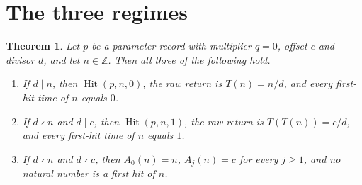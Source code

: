 \documentclass[11pt,letterpaper]{article}
\newcommand{\Z}{\mathbb{Z}}
\newtheorem{theorem}{Theorem}
\begin{document}
\section{The three regimes}

\begin{theorem}
\label{thm:zero-hit-cases}
Let \(p\) be a parameter record with multiplier \(q=0\), offset \(c\) and divisor \(d\), and let \(n\in\Z\). Then all three of the following hold.
\begin{enumerate}[label=\textup{(\roman*)}]
\item If \(d\mid n\), then \(\operatorname{Hit}(p,n,0)\), the raw return is \(T(n)=n/d\), and every first-hit time of \(n\) equals \(0\).
\item If \(d\nmid n\) and \(d\mid c\), then \(\operatorname{Hit}(p,n,1)\), the raw return is \(T(T(n))=c/d\), and every first-hit time of \(n\) equals \(1\).
\item If \(d\nmid n\) and \(d\nmid c\), then \(A_0(n)=n\), \(A_j(n)=c\) for every \(j\ge 1\), and no natural number is a first hit of \(n\).
\end{enumerate}
\end{theorem}
\end{document}
